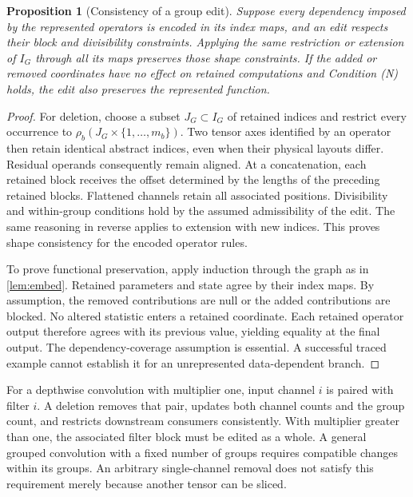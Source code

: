\documentclass[10pt]{article}
\theoremstyle{paper}
\newtheorem{proposition}[theorem]{Proposition}
\begin{document}
\begin{proposition}[Consistency of a group edit]
\label{prop:edit}
Suppose every dependency imposed by the represented operators is encoded in its index maps, and an edit respects their block and divisibility constraints. Applying the same restriction or extension of $I_G$ through all its maps preserves those shape constraints. If the added or removed coordinates have no effect on retained computations and Condition (N) holds, the edit also preserves the represented function.
\end{proposition}
\begin{proof}
For deletion, choose a subset $J_G\subset I_G$ of retained indices and restrict every occurrence to $\rho_b(J_G\times\{1,\ldots,m_b\})$. Two tensor axes identified by an operator then retain identical abstract indices, even when their physical layouts differ. Residual operands consequently remain aligned. At a concatenation, each retained block receives the offset determined by the lengths of the preceding retained blocks. Flattened channels retain all associated positions. Divisibility and within-group conditions hold by the assumed admissibility of the edit. The same reasoning in reverse applies to extension with new indices. This proves shape consistency for the encoded operator rules.

To prove functional preservation, apply induction through the graph as in \cref{lem:embed}. Retained parameters and state agree by their index maps. By assumption, the removed contributions are null or the added contributions are blocked. No altered statistic enters a retained coordinate. Each retained operator output therefore agrees with its previous value, yielding equality at the final output. The dependency-coverage assumption is essential. A successful traced example cannot establish it for an unrepresented data-dependent branch.
\end{proof}

For a depthwise convolution \citep{howard2017mobilenets} with multiplier one, input channel $i$ is paired with filter $i$. A deletion removes that pair, updates both channel counts and the group count, and restricts downstream consumers consistently. With multiplier greater than one, the associated filter block must be edited as a whole. A general grouped convolution with a fixed number of groups requires compatible changes within its groups. An arbitrary single-channel removal does not satisfy this requirement merely because another tensor can be sliced.
\end{document}
